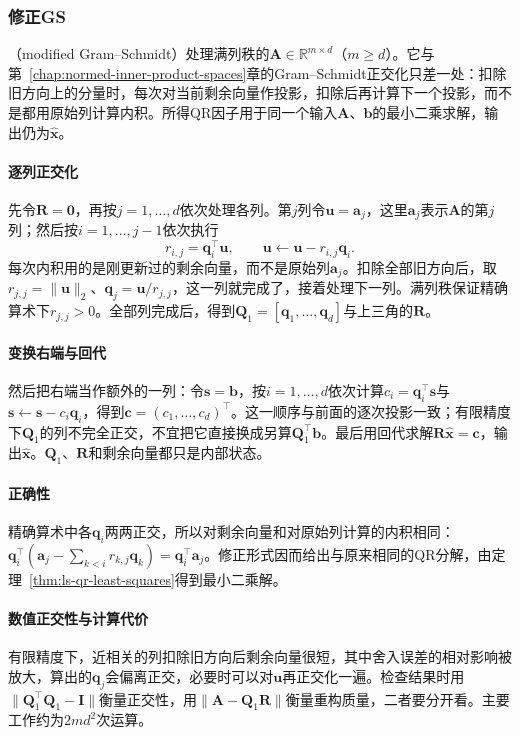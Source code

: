 \subsubsection{修正GS}
\label{sec:ls-mgs}

（modified Gram--Schmidt）处理满列秩的$\bm A\in\mathbb R^{m\times d}$（$m\geq d$）。它与第~\ref{chap:normed-inner-product-spaces}章的Gram--Schmidt正交化只差一处：扣除旧方向上的分量时，每次对当前剩余向量作投影，扣除后再计算下一个投影，而不是都用原始列计算内积。所得QR因子用于同一个输入$\bm A$、$\bm b$的最小二乘求解，输出仍为$\hat{\bm x}$。

\paragraph{逐列正交化}
先令$\bm R=\bm0$，再按$j=1,\ldots,d$依次处理各列。第$j$列令$\bm u=\bm a_j$，这里$\bm a_j$表示$\bm A$的第$j$列；然后按$i=1,\ldots,j-1$依次执行
\[
 r_{i,j}=\bm q_i^\top\bm u,\qquad \bm u\leftarrow\bm u-r_{i,j}\bm q_i .
\]
每次内积用的是刚更新过的剩余向量，而不是原始列$\bm a_j$。扣除全部旧方向后，取$r_{j,j}=\lVert\bm u\rVert_2$、$\bm q_j=\bm u/r_{j,j}$，这一列就完成了，接着处理下一列。满列秩保证精确算术下$r_{j,j}>0$。全部列完成后，得到$\bm Q_1=[\bm q_1,\ldots,\bm q_d]$与上三角的$\bm R$。

\paragraph{变换右端与回代}
然后把右端当作额外的一列：令$\bm s=\bm b$，按$i=1,\ldots,d$依次计算$c_i=\bm q_i^\top\bm s$与$\bm s\leftarrow\bm s-c_i\bm q_i$，得到$\bm c=(c_1,\ldots,c_d)^\top$。这一顺序与前面的逐次投影一致；有限精度下$\bm Q_1$的列不完全正交，不宜把它直接换成另算$\bm Q_1^\top\bm b$。最后用回代求解$\bm R\hat{\bm x}=\bm c$，输出$\hat{\bm x}$。$\bm Q_1$、$\bm R$和剩余向量都只是内部状态。

\paragraph{正确性}
精确算术中各$\bm q_i$两两正交，所以对剩余向量和对原始列计算的内积相同：$\bm q_i^\top(\bm a_j-\sum_{k<i}r_{k,j}\bm q_k)=\bm q_i^\top\bm a_j$。修正形式因而给出与原来相同的QR分解，由定理~\ref{thm:ls-qr-least-squares}得到最小二乘解。

\paragraph{数值正交性与计算代价}
有限精度下，近相关的列扣除旧方向后剩余向量很短，其中舍入误差的相对影响被放大，算出的$\bm q_j$会偏离正交，必要时可以对$\bm u$再正交化一遍。检查结果时用$\lVert\bm Q_1^\top\bm Q_1-\bm I\rVert$衡量正交性，用$\lVert\bm A-\bm Q_1\bm R\rVert$衡量重构质量，二者要分开看。主要工作约为$2md^2$次运算。

